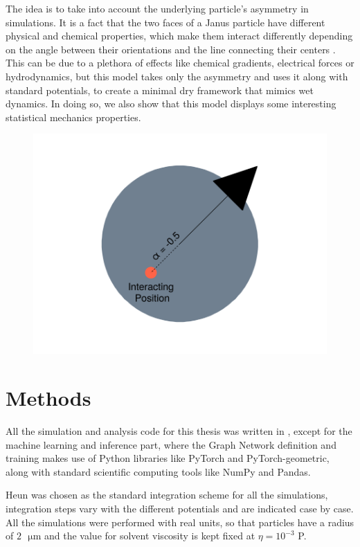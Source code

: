 \documentclass[../../master_thesis_np.tex]{subfiles}
\begin{document}
	The idea is to take into account the underlying particle's asymmetry in simulations. It is a fact that the two faces of a Janus particle have different physical and chemical properties, which make them interact differently depending on the angle between their orientations and the line connecting their centers \cite{singh_pair_2024}. This can be due to a plethora of effects like chemical gradients, electrical forces or hydrodynamics, but this model takes only the asymmetry and uses it along with standard potentials, to create a minimal dry framework that mimics wet dynamics. In doing so, we also show that this model displays some interesting statistical mechanics properties.
	
	\begin{figure}[htp]
		\centering
		\includegraphics[width=\textwidth]{singpart_draw.png}
		\caption{}
		\label{fig:geom_model}
	\end{figure}
	
	\section{Methods}
	All the simulation and analysis code for this thesis was written in \julia, except for the machine learning and inference part, where the Graph Network definition and training makes use of Python libraries like PyTorch and PyTorch-geometric, along with standard scientific computing tools like NumPy and Pandas.
	
	Heun was chosen as the standard integration scheme for all the simulations, integration steps vary with the different potentials and are indicated case by case. All the simulations were performed with real units, so that particles have a radius of $2\text{ }\mathrm{\mu m}$ and the value for solvent viscosity is kept fixed at $\eta = 10^{-3}$ P.
	
\end{document}
